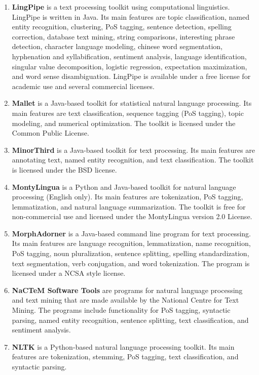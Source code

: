\documentclass[a4paper,twoside]{book}      %
\begin{document}
\begin{enumerate}
\item \textbf{LingPipe} \cite{lingpipe} is a text processing toolkit using computational linguistics. LingPipe is written in Java. Its main features are topic classification, named entity recognition, clustering, PoS tagging, sentence detection, spelling correction, database text mining, string comparisons, interesting phrase detection, character language modeling, chinese word segmentation, hyphenation and syllabification, sentiment analysis, language identification, singular value decomposition, logistic regression, expectation maximization, and word sense disambiguation.
LingPipe is available under a free license for academic use and several commercial licenses.
\item \textbf{Mallet} \cite{mccallum2002mallet} is a Java-based toolkit for statistical natural language processing. Its main features are text classification, sequence tagging (PoS tagging), topic modeling, and numerical optimization.
The toolkit is licensed under the Common Public License.
\item \textbf{MinorThird} \cite{cohen2004minorthird} is a Java-based toolkit for text processing. Its main features are annotating text, named entity recognition, and text classification.
The toolkit is licensed under the BSD license.
\item \textbf{MontyLingua} \cite{liu2004montylingua} is a Python and Java-based toolkit for natural language processing (English only). Its main features are tokenization, PoS tagging, lemmatization, and natural language summarization.
The toolkit is free for non-commercial use and licensed under the MontyLingua version 2.0 License.
\item \textbf{MorphAdorner} \cite{morphadorner} is a Java-based command line program for text processing. Its main features are language recognition, lemmatization, name recognition, PoS tagging, noun pluralization, sentence splitting, spelling standardization, text segmentation, verb conjugation, and word tokenization.
The program is licensed under a NCSA style license.
\item \textbf{NaCTeM Software Tools} \cite{nactem} are programs for natural language processing and text mining that are made available by the National Centre for Text Mining. The programs include functionality for PoS tagging, syntactic parsing, named entity recognition, sentence splitting, text classification, and sentiment analysis.
\item \textbf{NLTK} \cite{loper2002nltk} is a Python-based natural language processing toolkit. Its main features are tokenization, stemming, PoS tagging, text classification, and syntactic parsing.

\end{enumerate}
\end{document}
